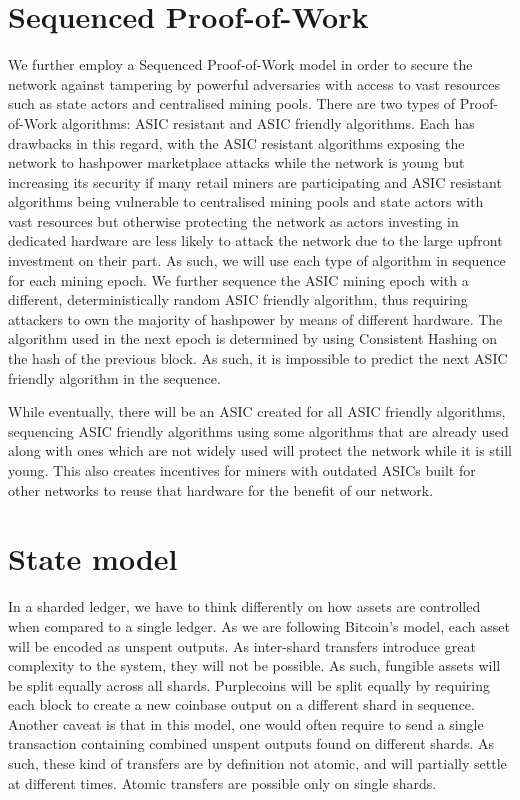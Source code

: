 \documentclass[notitlepage]{article}
\begin{document}
\section{Sequenced Proof-of-Work}
We further employ a Sequenced Proof-of-Work model in order to secure the network against tampering by powerful adversaries with access to vast resources such as state actors and centralised mining pools. There are two types of Proof-of-Work algorithms: ASIC resistant and ASIC friendly algorithms. Each has drawbacks in this regard, with the ASIC resistant algorithms exposing the network to hashpower marketplace attacks while the network is young but increasing its security if many retail miners are participating and ASIC resistant algorithms being vulnerable to centralised mining pools and state actors with vast resources but otherwise protecting the network as actors investing in dedicated hardware are less likely to attack the network due to the large upfront investment on their part. As such, we will use each type of algorithm in sequence for each mining epoch. We further sequence the ASIC mining epoch with a different, deterministically random ASIC friendly algorithm, thus requiring attackers to own the majority of hashpower by means of different hardware. The algorithm used in the next epoch is determined by using Consistent Hashing on the hash of the previous block. As such, it is impossible to predict the next ASIC friendly algorithm in the sequence.

While eventually, there will be an ASIC created for all ASIC friendly algorithms, sequencing ASIC friendly algorithms using some algorithms that are already used along with ones which are not widely used will protect the network while it is still young. This also creates incentives for miners with outdated ASICs built for other networks to reuse that hardware for the benefit of our network.

\section{State model}
In a sharded ledger, we have to think differently on how assets are controlled when compared to a single ledger. As we are following Bitcoin's model, each asset will be encoded as unspent outputs. As inter-shard transfers introduce great complexity to the system, they will not be possible. As such, fungible assets will be split equally across all shards. Purplecoins will be split equally by requiring each block to create a new coinbase output on a different shard in sequence. Another caveat is that in this model, one would often require to send a single transaction containing combined unspent outputs found on different shards. As such, these kind of transfers are by definition not atomic, and will partially settle at different times. Atomic transfers are possible only on single shards. 
\end{document}
